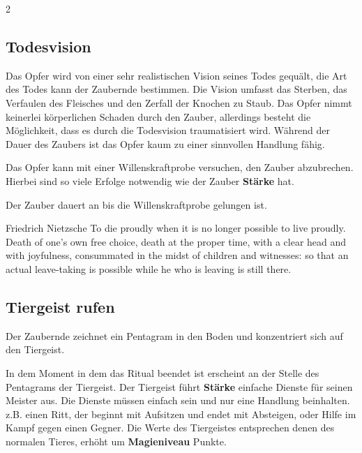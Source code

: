 \begin{multicols*}{2}
\subsection{Todesvision}

Das Opfer wird von einer sehr realistischen Vision seines Todes gequält, die Art des Todes kann der Zaubernde bestimmen. Die Vision umfasst das Sterben, das Verfaulen des Fleisches und den Zerfall der Knochen zu Staub. Das Opfer nimmt keinerlei körperlichen Schaden durch den Zauber, allerdings besteht die Möglichkeit, dass es durch die Todesvision traumatisiert wird. Während der Dauer des Zaubers ist das Opfer kaum zu einer sinnvollen Handlung fähig.

Das Opfer kann mit einer Willenskraftprobe versuchen, den Zauber abzubrechen. Hierbei sind so viele Erfolge notwendig wie der Zauber \textbf{Stärke} hat.

Der Zauber dauert an bis die Willenskraftprobe gelungen ist.

\begin{pquote}{Friedrich Nietzsche}
To die proudly when it is no longer possible to live proudly. Death of one's own free choice, death at the proper time, with a clear head and with joyfulness, consummated in the midst of children and witnesses: so that an actual leave-taking is possible while he who is leaving is still there.
\end{pquote}



\subsection{Tiergeist rufen}

Der Zaubernde zeichnet ein Pentagram in den Boden und konzentriert sich auf den Tiergeist.

In dem Moment in dem das Ritual beendet ist erscheint an der Stelle des Pentagrams der Tiergeist. Der Tiergeist führt \textbf{Stärke} einfache Dienste für seinen Meister aus. Die Dienste müssen einfach sein und nur eine Handlung beinhalten. z.B. einen Ritt, der beginnt mit Aufsitzen und endet mit Absteigen, oder Hilfe im Kampf gegen einen Gegner. Die Werte des Tiergeistes entsprechen denen des normalen Tieres, erhöht um \textbf{Magieniveau} Punkte.




\end{multicols*}
